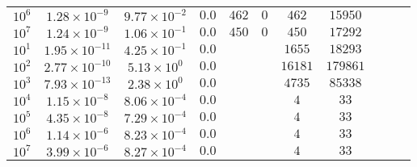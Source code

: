 \begin{tabular}{l c c c c c c c c c c}
$10^6$  &  $1.28 \times 10^{-9}$  &  $9.77 \times 10^{-2}$  &  $0.0$  &  $462$  &  $0$  &  $462$  &  $15950$  & & & \\ 
$10^7$  &  $1.24 \times 10^{-9}$  &  $1.06 \times 10^{-1}$  &  $0.0$  &  $450$  &  $0$  &  $450$  &  $17292$  & & & \\ 
\hline \hline
$10^1$  &  $1.95 \times 10^{-11}$  &  $4.25 \times 10^{-1}$ & $0.0$ &  &  & $1655$ & $18293$ & & & \\ 
$10^2$  &  $2.77 \times 10^{-10}$  &  $5.13 \times 10^{0}$ & $0.0$ &  &  & $16181$ & $179861$ & & & \\ 
$10^3$  &  $7.93 \times 10^{-13}$  &  $2.38 \times 10^{0}$ & $0.0$ &  &  & $4735$ & $85338$ & & & \\ 
$10^4$  &  $1.15 \times 10^{-8}$  &  $8.06 \times 10^{-4}$ & $0.0$ &  &  & $4$ & $33$ & & & \\ 
$10^5$  &  $4.35 \times 10^{-8}$  &  $7.29 \times 10^{-4}$ & $0.0$ &  &  & $4$ & $33$ & & & \\ 
$10^6$  &  $1.14 \times 10^{-6}$  &  $8.23 \times 10^{-4}$ & $0.0$ &  &  & $4$ & $33$ & & & \\ 
$10^7$  &  $3.99 \times 10^{-6}$  &  $8.27 \times 10^{-4}$ & $0.0$ &  &  & $4$ & $33$ & & & \\ 
\end{tabular}
